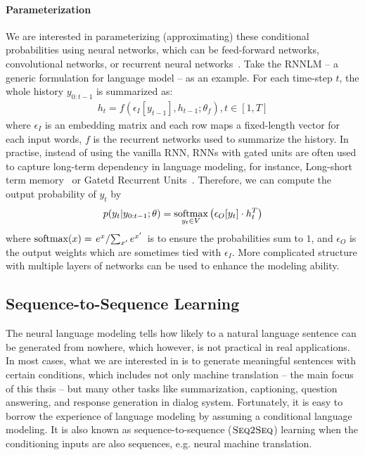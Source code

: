 \paragraph{Parameterization} 
We are interested in parameterizing (approximating) these conditional probabilities using neural networks, which can be feed-forward networks, convolutional networks, or recurrent neural networks~\citep[RNNLM, ][]{mikolov2010recurrent}. 
Take the RNNLM -- a generic formulation for language model -- as an example. For each time-step $t$, the whole history $y_{0: t-1}$ is summarized as:
\begin{equation}
    \begin{split}
         h_t = f(\epsilon_I[y_{t-1}], h_{t-1}; {\theta}_f) , t \in [1, T]
    \end{split}
\end{equation}
where $\epsilon_I$ is an embedding matrix and each row maps a fixed-length vector for each input words, $f$ is the recurrent networks used to summarize the history. In practise, instead of using the vanilla RNN, RNNs with gated units are often used to capture long-term dependency in language modeling, for instance, Long-short term memory~\citep[LSTM,][]{hochreiter1997long} or Gatetd Recurrent Units~\citep[GRU,][]{cho2014learning}.
Therefore, we can compute the output probability of $y_t$ by
\begin{equation}
    \label{cp2.eq.output}
    p(y_t|y_{0: t-1};\theta) = \mathop{\operatorname{\text{softmax}}}\limits_{y_t\in V}\left(\epsilon_O[y_t]\cdot h_t^T\right)
\end{equation}
where $\operatorname{\text{softmax}}(x) = \left. {e^x} \large / {\sum_{x'} e^{x'}} \right.$ is to ensure the probabilities sum to $1$, and $\epsilon_O$ is the output weights which are sometimes tied with $\epsilon_I$. More complicated structure with multiple layers of networks can be used to enhance the modeling ability.



\subsection{Sequence-to-Sequence Learning}
The neural language modeling tells how likely to a natural language sentence can be generated from nowhere, which however, is not practical in real applications. In most cases, what we are interested in is to generate meaningful sentences with certain conditions, which includes not only machine translation -- the main focus of this thsis -- but many other tasks like summarization, captioning, question answering, and response generation in dialog system. Fortunately, it is easy to borrow the experience of language modeling by assuming a conditional language modeling. 
It is also known as sequence-to-sequence (${{\textsc{Seq2Seq}}}$) learning when the conditioning inputs are also sequences, e.g. neural machine translation.

